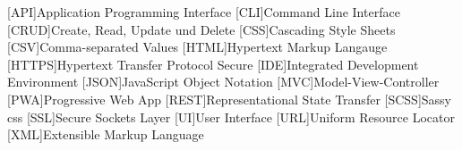 \begin{acronym}[MMMMMM]
 
 	[API]{Application Programming Interface}
	[CLI]{Command Line Interface}
	[CRUD]{Create, Read, Update und Delete}
	[CSS]{Cascading Style Sheets}
	[CSV]{Comma-separated Values}
	[HTML]{Hypertext Markup Langauge}
	[HTTPS]{Hypertext Transfer Protocol Secure}
	[IDE]{Integrated Development Environment}
	[JSON]{JavaScript Object Notation}
	[MVC]{Model-View-Controller}
	[PWA]{Progressive Web App}
	[REST]{Representational State Transfer}
	[SCSS]{Sassy \acs{css}}
	[SSL]{Secure Sockets Layer}
	[UI]{User Interface}
	[URL]{Uniform Resource Locator}
	[XML]{Extensible Markup Language}

\end{acronym}
